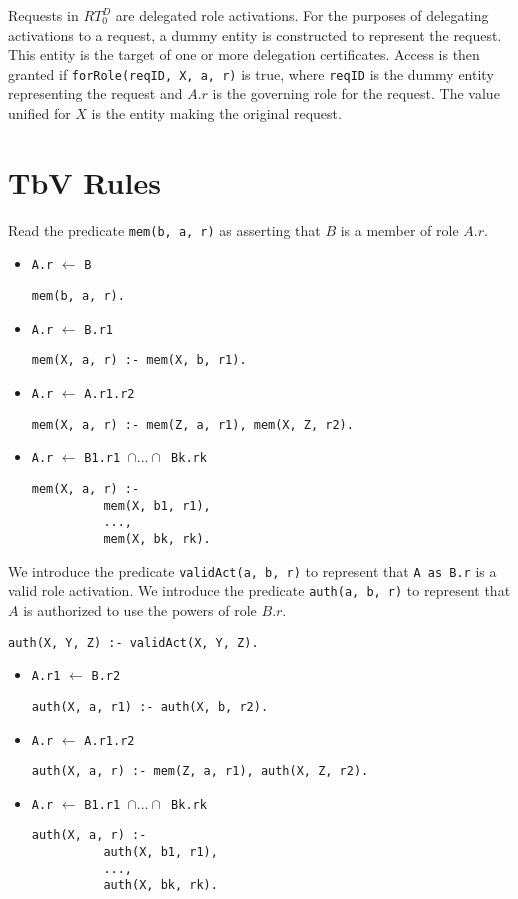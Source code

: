 \documentclass{article}
\newcommand{\predicate}[1]{\texttt{#1}}
\newcommand{\memcert}[2]{\texttt{#1} $\leftarrow$ \texttt{#2}}
\newcommand{\activate}[2]{\texttt{#1 as #2}}
\begin{document}
Requests in $RT_0^D$ are delegated role activations. For the purposes of
delegating activations to a request, a dummy entity is constructed to
represent the request. This entity is the target of one or more
delegation certificates. Access is then granted if
\texttt{forRole(reqID, X, a, r)} is true, where \texttt{reqID} is the
dummy entity representing the request and $A.r$ is the governing role
for the request. The value unified for $X$ is the entity making the
original request.

\section{TbV Rules}

Read the predicate \predicate{mem(b, a, r)} as asserting that $B$ is a
member of role $A.r$.

\begin{itemize}

\item \memcert{A.r}{B}

\texttt{mem(b, a, r).}

\item \memcert{A.r}{B.r1}

\texttt{mem(X, a, r) :- mem(X, b, r1).}

\item \memcert{A.r}{A.r1.r2}

\texttt{mem(X, a, r) :- mem(Z, a, r1), mem(X, Z, r2).}

\item \memcert{A.r}{B1.r1 $\cap \ldots \cap$ Bk.rk}
\begin{verbatim}
mem(X, a, r) :-
          mem(X, b1, r1),
          ...,
          mem(X, bk, rk).
\end{verbatim}

\end{itemize}

We introduce the predicate \predicate{validAct(a, b, r)} to represent
that \activate{A}{B.r} is a valid role activation. We introduce the
predicate \predicate{auth(a, b, r)} to represent that $A$ is authorized
to use the powers of role $B.r$.

\texttt{auth(X, Y, Z) :- validAct(X, Y, Z).}

\begin{itemize}

\item \memcert{A.r1}{B.r2}

\texttt{auth(X, a, r1) :- auth(X, b, r2).}

\item \memcert{A.r}{A.r1.r2}

\texttt{auth(X, a, r) :- mem(Z, a, r1), auth(X, Z, r2).}

\item \memcert{A.r}{B1.r1 $\cap \ldots \cap$ Bk.rk}
\begin{verbatim}
auth(X, a, r) :-
          auth(X, b1, r1),
          ...,
          auth(X, bk, rk).
\end{verbatim}
\end{itemize}
\end{document}
